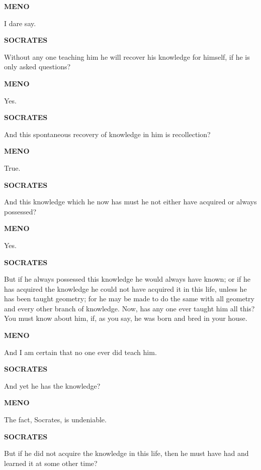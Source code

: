 \documentclass[11pt,letter]{article}
\begin{document}
\par \textbf{MENO}
\par   I dare say.

\par \textbf{SOCRATES}
\par   Without any one teaching him he will recover his knowledge for himself, if he is only asked questions?

\par \textbf{MENO}
\par   Yes.

\par \textbf{SOCRATES}
\par   And this spontaneous recovery of knowledge in him is recollection?

\par \textbf{MENO}
\par   True.

\par \textbf{SOCRATES}
\par   And this knowledge which he now has must he not either have acquired or always possessed?

\par \textbf{MENO}
\par   Yes.

\par \textbf{SOCRATES}
\par   But if he always possessed this knowledge he would always have known; or if he has acquired the knowledge he could not have acquired it in this life, unless he has been taught geometry; for he may be made to do the same with all geometry and every other branch of knowledge. Now, has any one ever taught him all this? You must know about him, if, as you say, he was born and bred in your house.

\par \textbf{MENO}
\par   And I am certain that no one ever did teach him.

\par \textbf{SOCRATES}
\par   And yet he has the knowledge?

\par \textbf{MENO}
\par   The fact, Socrates, is undeniable.

\par \textbf{SOCRATES}
\par   But if he did not acquire the knowledge in this life, then he must have had and learned it at some other time?
\end{document}
